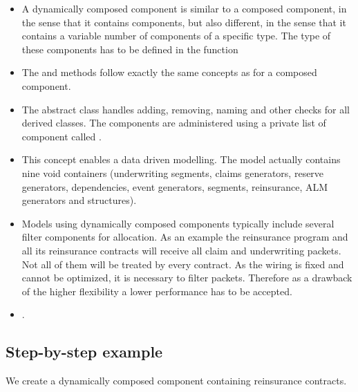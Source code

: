 \begin{itemize}
  \item A dynamically composed component is similar to a composed component, in the sense
        that it contains components, but also different, in the sense that it contains a
        variable number of components of a specific type. The type of these components has
        to be defined in the function 
  \item The  and  methods follow exactly the same concepts as for a composed component.
  \item The abstract class  handles adding, removing, naming and other checks for all derived classes. The components are administered using a private list of component called .
  \item This concept enables a data driven modelling. The \PODRA{} model actually contains nine void containers (underwriting segments, claims generators, reserve generators, dependencies, event generators, segments, reinsurance, ALM generators and structures).
  \item Models using dynamically composed components typically include several filter components for allocation. As an example the reinsurance program and all its reinsurance contracts will receive all claim and underwriting packets. Not all of them will be treated by every contract. As the wiring is fixed and cannot be optimized, it is necessary to filter packets. Therefore as a drawback of the higher flexibility a lower performance has to be accepted.
  \item {}.
\end{itemize}

\subsection*{Step-by-step example}
\label{subpar:dcc-eg-steps}

We create a dynamically composed component containing reinsurance contracts.

